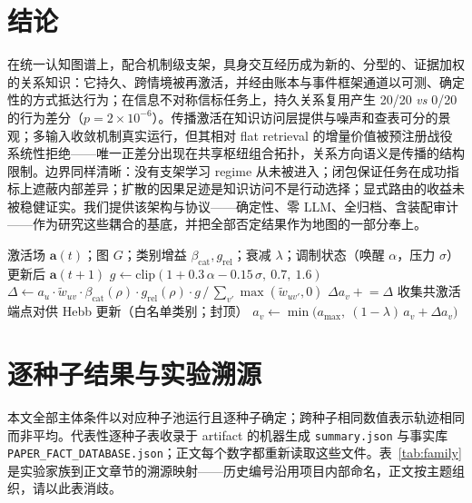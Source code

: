 \documentclass[10pt,a4paper]{ctexart}
\begin{document}
\section{结论}
在统一认知图谱上，配合机制级支架，具身交互经历成为新的、分型的、证据加权的关系知识：它持久、跨情境被再激活，并经由账本与事件框架通道以可测、确定性的方式抵达行为；在信息不对称信标任务上，持久关系复用产生 20/20 \emph{vs} 0/20 的行为差分（$p{=}2\times10^{-6}$）。传播激活在知识访问层提供与噪声和查表可分的景观；多输入收敛机制真实运行，但其相对 flat retrieval 的增量价值被预注册战役系统性拒绝——唯一正差分出现在共享枢纽组合拓扑，关系方向语义是传播的结构限制。边界同样清晰：没有支架学习 regime 从未被进入；闭包保证任务在成功指标上遮蔽内部差异；扩散的因果足迹是知识访问不是行动选择；显式路由的收益未被稳健证实。我们提供该架构与协议——确定性、零 LLM、全归档、含装配审计——作为研究这些耦合的基底，并把全部否定结果作为地图的一部分奉上。

\begin{algorithm}[t]
\caption{带调制与抑制的传播激活步}\label{alg:spread}
\begin{algorithmic}[1]
\Require 激活场 $\mathbf{a}(t)$；图 $G$；类别增益 $\beta_{\mathrm{cat}}, g_{\mathrm{rel}}$；衰减 $\lambda$；调制状态（唤醒 $\alpha$，压力 $\sigma$）
\Ensure 更新后 $\mathbf{a}(t{+}1)$
\State $g \gets \mathrm{clip}(1 + 0.3\,\alpha - 0.15\,\sigma,\ 0.7,\ 1.6)$
    \State $\Delta \gets a_u \cdot \tilde w_{uv} \cdot \beta_{\mathrm{cat}}(\rho) \cdot g_{\mathrm{rel}}(\rho) \cdot g \,/\, \sum_{v'} \max(\tilde w_{uv'},0)$
    \State $\Delta a_v \mathrel{+}= \Delta$ 
  \EndFor
  \State 收集共激活端点对供 Hebb 更新（白名单类别；封顶）
\EndFor
{}
  \State $a_v \gets \min\big(a_{\max},\ (1-\lambda)\,a_v + \Delta a_v\big)$
\EndFor
\end{algorithmic}
\end{algorithm}




\appendix
\section{逐种子结果与实验溯源}
\label{app:seeds}
本文全部主体条件以对应种子池运行且逐种子确定；跨种子相同数值表示轨迹相同而非平均。代表性逐种子表收录于 artifact 的机器生成 \texttt{summary.json} 与事实库 \texttt{PAPER\_FACT\_DATABASE.json}；正文每个数字都重新读取这些文件。表~\ref{tab:family} 是实验家族到正文章节的溯源映射——历史编号沿用项目内部命名，正文按主题组织，请以此表消歧。
\end{document}
